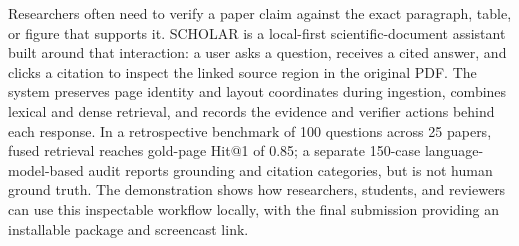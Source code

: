 Researchers often need to verify a paper claim against the exact paragraph, table, or figure that supports it. \textsc{SCHOLAR} is a local-first scientific-document assistant built around that interaction: a user asks a question, receives a cited answer, and clicks a citation to inspect the linked source region in the original PDF. The system preserves page identity and layout coordinates during ingestion, combines lexical and dense retrieval, and records the evidence and verifier actions behind each response. In a retrospective benchmark of 100 questions across 25 papers, fused retrieval reaches gold-page Hit@1 of 0.85; a separate 150-case language-model-based audit reports grounding and citation categories, but is not human ground truth. The demonstration shows how researchers, students, and reviewers can use this inspectable workflow locally, with the final submission providing an installable package and screencast link.
